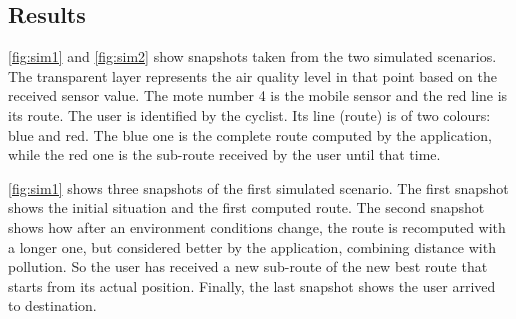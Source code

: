 \subsection{Results}

\autoref{fig:sim1} and \autoref{fig:sim2} show snapshots taken from the two simulated scenarios.
The transparent layer represents the air quality level in that point based on the received sensor value.
The mote number 4 is the mobile sensor and the red line is its route.
The user is identified by the cyclist. 
Its line (route) is of two colours: blue and red.
The blue one is the complete route computed by the application, while the red one is the sub-route received by the user until that time. 

\autoref{fig:sim1} shows three snapshots of the first simulated scenario.
The first snapshot shows the initial situation and the first computed route.
The second snapshot shows how after an environment conditions change, the route is recomputed with a longer one, but considered better by the application, combining distance with pollution. 
So the user has received a new sub-route of the new best route that starts from its actual position.
Finally, the last snapshot shows the user arrived to destination.
% 
